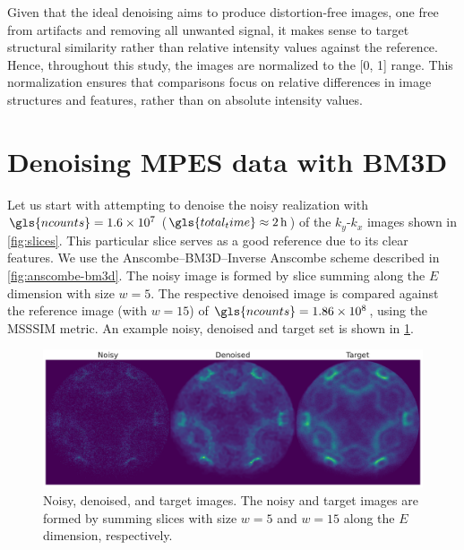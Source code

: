 Given that the ideal denoising aims to produce distortion-free images, one free from artifacts and removing all unwanted signal, it makes sense to target structural similarity rather than relative intensity values against the reference. Hence, throughout this study, the images are normalized to the [\num{0}, \num{1}] range. This normalization ensures that comparisons focus on relative differences in image structures and features, rather than on absolute intensity values.

\section{Denoising MPES data with BM3D}
Let us start with attempting  to denoise the noisy realization with $\gls{ncounts}=\num{1.6e7}$ ($\gls{total_time}\approx\qty{2}{h}$) of the $k_y$-$k_x$ images shown in \cref{fig:slices}. This particular slice serves as a good reference due to its clear features. We use the Anscombe--\gls{BM3D}--Inverse Anscombe scheme described in \cref{fig:anscombe-bm3d}. The noisy image is formed by slice summing along the $E$ dimension with size $w = 5$. The respective denoised image is compared against the reference image (with $w=15$) of $\gls{ncounts}=\num{1.86e8}$, using the \gls{MSSSIM} metric. An example noisy, denoised and target set is shown in \cref{fig:noisy-denoised-ref-16M-avg-bm3d}. 

\begin{figure}
    \centering
    \includegraphics[width=1\linewidth]{images/noisy_denoised_ref_16M_avg_bm3d.pdf}
    \caption{Noisy, denoised, and target images. The noisy and target images are formed by summing slices with size $w=5$ and $w=15$ along the $E$ dimension, respectively.}
    \label{fig:noisy-denoised-ref-16M-avg-bm3d}
\end{figure}

